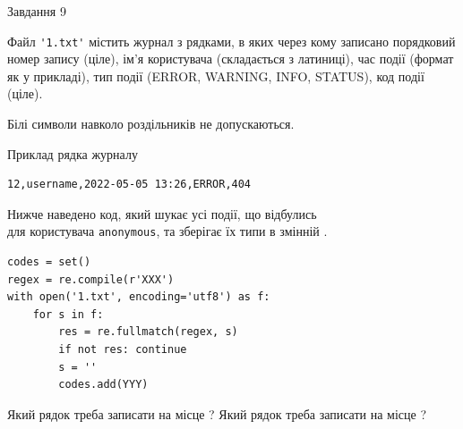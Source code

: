 \documentclass[12pt, ukrainian]{article}
\def\code#1{\Verb!#1!}
\begin{document}
{\begin{minipage}[t]{8.0cm}
\end{minipage}

               
{\begin{center}Завдання {9}\end{center}}
\vspace{-4mm}
Файл \code{'1.txt'} містить журнал з рядками, в яких через кому записано поряд\-ко\-вий номер запису (ціле), ім'я користувача (складається з латиниці), час події (фор\-мат як у прикладі), тип події (ERROR, WARNING, INFO, STATUS), код події (ціле).

Білі символи навколо роздільників не допускаються.

Приклад рядка журналу



\begin{verbatim}
12,username,2022-05-05 13:26,ERROR,404
\end{verbatim}


Нижче наведено код, який шукає усі події, що відбулись\\ для користувача \code{anonymous}, та зберігає їх типи в змінній .



\begin{verbatim}
codes = set()
regex = re.compile(r'XXX')
with open('1.txt', encoding='utf8') as f:
    for s in f:
        res = re.fullmatch(regex, s)
        if not res: continue
        s = ''
        codes.add(YYY)
\end{verbatim}



Який рядок треба записати на місце  ?
Який рядок треба записати на місце  ?\par

}
\newpage
\end{document}

